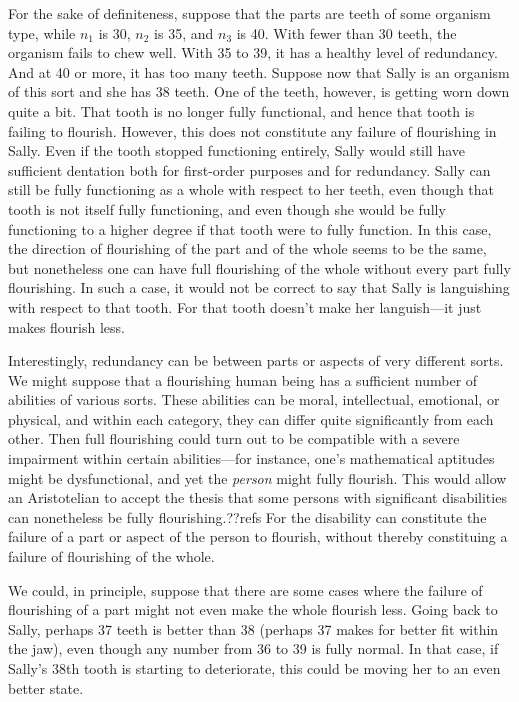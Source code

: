 For the sake of definiteness, suppose that the parts are teeth of some organism type, while $n_1$ is 30, $n_2$ is 35, and $n_3$ is 40. With fewer
than 30 teeth, the organism fails to chew well. With 35 to 39, it has a healthy level of redundancy. And at 40 or more,
it has too many teeth. Suppose now that Sally is an organism of this sort and she has 38 teeth. One of the teeth, however,
is getting worn down quite a bit. That tooth is no longer fully functional, and hence that tooth is failing to flourish.
However, this does not constitute any failure of flourishing in Sally. Even if the tooth stopped functioning entirely,
Sally would still have sufficient dentation both for first-order purposes and for redundancy. Sally can still be fully
functioning as a whole with respect to her teeth, even though that tooth is not itself fully functioning, and even though
she would be fully functioning to a higher degree if that tooth were to fully function. In this case, the direction of
flourishing of the part and of the whole seems to be the same, but nonetheless one can have full flourishing of the whole
without every part fully flourishing. In such a case, it would not be correct to say that Sally is languishing with respect
to that tooth. For that tooth doesn't make her languish---it just makes flourish less.

Interestingly, redundancy can be between parts or aspects of very different sorts. We might suppose that a flourishing human 
being has a sufficient number of abilities of various sorts. These abilities can be moral, intellectual, emotional, or physical, and
within each category, they can differ quite significantly from each other. Then full flourishing could turn out to be compatible with a severe
impairment within certain abilities---for instance, one's mathematical aptitudes might be dysfunctional, and yet the \textit{person} 
might fully flourish. This would allow an Aristotelian to accept the thesis that some persons with significant disabilities can nonetheless
be fully flourishing.??refs For the disability can constitute the failure of a part or aspect of the person to flourish, without
thereby constituing a failure of flourishing of the whole. 

We could, in principle, suppose that there are some cases where the failure of flourishing of a part might not even make the 
whole flourish less. Going back to Sally, perhaps 37 teeth is better than 38 (perhaps 37 makes for better fit within the jaw),
even though any number from 36 to 39 is fully normal. In that case, if Sally's 38th tooth is starting to deteriorate, this could
be moving her to an even better state. 

